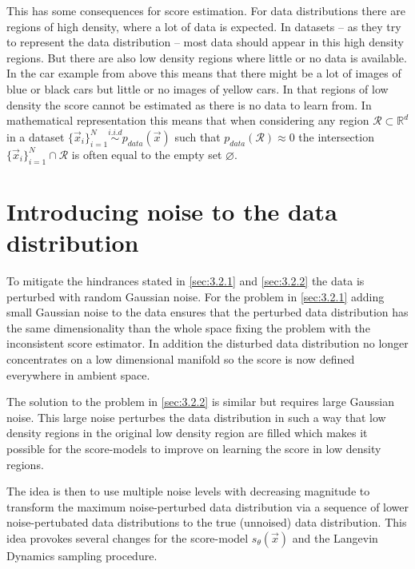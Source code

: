 This has some consequences for score estimation. For data distributions there are regions of high density, where a lot of data is expected. In datasets – as they try to represent the data distribution – most data should appear in this high density regions. But there are also low density regions where little or no data is available. In the car example from above this means that there might be a lot of images of blue or black cars but little or no images of yellow cars. In that regions of low density the score cannot be estimated as there is no data to learn from. In mathematical representation this means that when considering any region $\mathcal{R}\subset\mathbb{R}^d$ in a dataset $\{\vec{x}_i\}_{i=1}^N\overset{i.i.d}{\sim}p_{data}(\vec{x})$ such that $p_{data}(\mathcal{R})\approx0$ the intersection $\{\vec{x}_i\}_{i=1}^N\cap\mathcal{R}$ is often equal to the empty set $\varnothing$. 

\section[Introducing noise to the data distribution]{Introducing noise to the data distribution%
    } \label{sec:3.3}
To mitigate the hindrances stated in \cref{sec:3.2.1} and \cref{sec:3.2.2} the data is perturbed with random Gaussian noise. For the problem in \cref{sec:3.2.1} adding small Gaussian noise to the data ensures that the perturbed data distribution has the same dimensionality than the whole space fixing the problem with the inconsistent score estimator. In addition the disturbed data distribution no longer concentrates on a low dimensional manifold so the score is now defined everywhere in ambient space.

The solution to the problem in \cref{sec:3.2.2} is similar but requires large Gaussian noise. This large noise perturbes the data distribution in such a way that low density regions in the original low density region are filled which makes it possible for the score-models to improve on learning the score in low density regions.

The idea is then to use multiple noise levels with decreasing magnitude to transform the maximum noise-perturbed data distribution via a sequence of lower noise-pertubated data distributions to the true (unnoised) data distribution. This idea provokes several changes for the score-model $s_\theta(\vec{x})$ and the Langevin Dynamics sampling procedure. 
%
